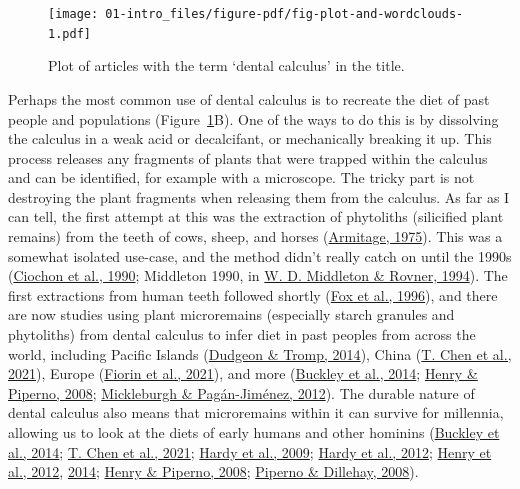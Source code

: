 \documentclass[
  letterpaper,
]{book}
\begin{document}
\begin{figure}

{\centering \texttt{[image: 01-intro\_files/figure-pdf/fig-plot-and-wordclouds-1.pdf]}

}

\caption{\label{fig-plot-and-wordclouds}Plot of articles with the term
`dental calculus' in the title.}

\end{figure}

Perhaps the most common use of dental calculus is to recreate the diet
of past people and populations (Figure~\ref{fig-plot-and-wordclouds}B).
One of the ways to do this is by dissolving the calculus in a weak acid
or decalcifant, or mechanically breaking it up. This process releases
any fragments of plants that were trapped within the calculus and can be
identified, for example with a microscope. The tricky part is not
destroying the plant fragments when releasing them from the calculus. As
far as I can tell, the first attempt at this was the extraction of
phytoliths (silicified plant remains) from the teeth of cows, sheep, and
horses
(\protect\hyperlink{ref-armitageExtractionIdentification1975}{Armitage,
1975}). This was a somewhat isolated use-case, and the method didn't
really catch on until the 1990s
(\protect\hyperlink{ref-ciochonOpalPhytoliths1990}{Ciochon et al.,
1990}; Middleton 1990, in
\protect\hyperlink{ref-middletonOpalPhytoliths1994}{W. D. Middleton \&
Rovner, 1994}). The first extractions from human teeth followed shortly
(\protect\hyperlink{ref-foxPhytolithCalculus1996}{Fox et al., 1996}),
and there are now studies using plant microremains (especially starch
granules and phytoliths) from dental calculus to infer diet in past
peoples from across the world, including Pacific Islands
(\protect\hyperlink{ref-dudgeonDietGeography2014}{Dudgeon \& Tromp,
2014}), China (\protect\hyperlink{ref-chenStarchGrains2021}{T. Chen et
al., 2021}), Europe
(\protect\hyperlink{ref-fiorinCombiningDental2021}{Fiorin et al.,
2021}), and more
(\protect\hyperlink{ref-buckleyDentalCalculus2014}{Buckley et al.,
2014}; \protect\hyperlink{ref-henryCalculusSyria2008}{Henry \& Piperno,
2008}; \protect\hyperlink{ref-mickleburghNewInsights2012}{Mickleburgh \&
Pagán-Jiménez, 2012}). The durable nature of dental calculus also means
that microremains within it can survive for millennia, allowing us to
look at the diets of early humans and other hominins
(\protect\hyperlink{ref-buckleyDentalCalculus2014}{Buckley et al.,
2014}; \protect\hyperlink{ref-chenStarchGrains2021}{T. Chen et al.,
2021}; \protect\hyperlink{ref-hardyStarchGranules2009}{Hardy et al.,
2009}; \protect\hyperlink{ref-hardyNeanderthalMedics2012}{Hardy et al.,
2012}; \protect\hyperlink{ref-henryDietAustralopithecus2012}{Henry et
al., 2012}, \protect\hyperlink{ref-henryNeanderthalCalculus2014}{2014};
\protect\hyperlink{ref-henryCalculusSyria2008}{Henry \& Piperno, 2008};
\protect\hyperlink{ref-pipernoStarchGrains2008}{Piperno \& Dillehay,
2008}).
\end{document}
